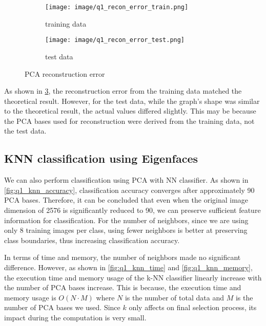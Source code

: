 \begin{figure}[htbp]
	\centering
	\begin{subfigure}[t]{0.4\linewidth}
		\centering
		\texttt{[image: image/q1\_recon\_error\_train.png]}
		\caption{training data}
		\label{fig:recon_error_train}
	\end{subfigure}%
    \hspace{0.2cm}
	\begin{subfigure}[t]{0.4\linewidth}
		\texttt{[image: image/q1\_recon\_error\_test.png]}
		\caption{test data}
		\label{fig:recon_error_test}
	\end{subfigure}
	\caption{PCA reconstruction error}
	\label{fig:recon_error}
\end{figure}

As shown in \cref{fig:recon_error}, the reconstruction error from the training data matched the theoretical result. However, for the test data, while the graph’s shape was similar to the theoretical result, the actual values differed slightly. This may be because the PCA bases used for reconstruction were derived from the training data, not the test data.

\vspace{-0.5cm}
\subsection{KNN classification using Eigenfaces}

We can also perform classification using PCA with NN classifier. As shown in \cref{fig:q1_knn_accuracy}, classification accuracy converges after approximately 90 PCA bases. Therefore, it can be concluded that even when the original image dimension of 2576 is significantly reduced to 90, we can preserve sufficient feature information for classification. For the number of neighbors, since we are using only 8 training images per class, using fewer neighbors is better at preserving class boundaries, thus increasing classification accuracy.

In terms of time and memory, the number of neighbors made no significant difference. However, as shown in \cref{fig:q1_knn_time} and \cref{fig:q1_knn_memory}, the execution time and memory usage of the k-NN classifier linearly increase  with the number of PCA bases increase. This is because, the execution time and memory usage is $O(N\cdot M)$ where $N$ is the number of total data and $M$ is the number of PCA bases we used. Since $k$ only affects on final selection process, its impact during the computation is very small.

